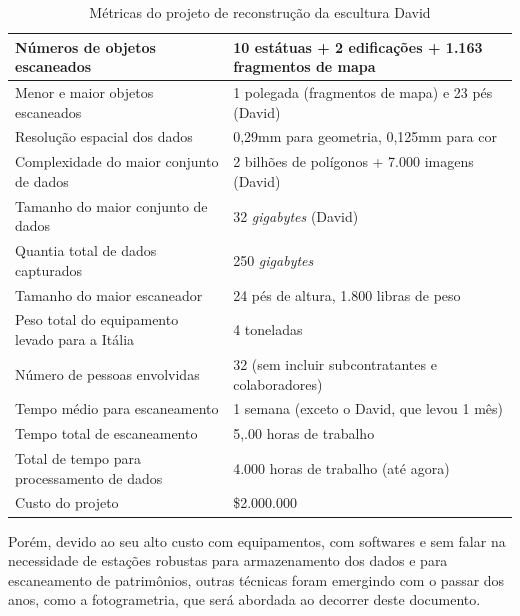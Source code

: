 \begin{table}
\caption{Métricas do projeto de reconstrução da escultura David}
\label{tab:metricasDavid}
\begin{tabular}{|l|p{4.7cm}|}
\hline
Números de objetos escaneados          & 10 estátuas + 2 edificações + 1.163 fragmentos de mapa  \\ \hline
Menor e maior objetos escaneados       & 1 polegada (fragmentos de mapa) e 23 pés (David)         \\ \hline
Resolução espacial dos dados                & 0,29mm para geometria, 0,125mm para cor              \\ \hline
Complexidade do maior conjunto de dados             & 2 bilhões de polígonos + 7.000 imagens (David)\\ \hline
Tamanho do maior conjunto de dados                    & 32 \emph{gigabytes} (David)                  \\ \hline
Quantia total de dados capturados              & 250 \emph{gigabytes}                                 \\ \hline
Tamanho do maior escaneador                    & 24 pés de altura, 1.800 libras de peso                  \\ \hline
Peso total do equipamento levado para a Itália & 4 toneladas                                              \\ \hline
Número de pessoas envolvidas                  & 32 (sem incluir subcontratantes e colaboradores) \\ \hline
Tempo médio para escaneamento              & 1 semana (exceto o David, que levou 1 mês)       \\ \hline
Tempo total de escaneamento                 & 5,.00 horas de trabalho                                   \\ \hline
Total de tempo para processamento de dados          & 4.000 horas de trabalho (até agora)                            \\ \hline
Custo do projeto                          & \$2.000.000                                         \\ \hline
\end{tabular}
\end{table}


Porém, devido ao seu alto custo com equipamentos, com softwares e sem falar na necessidade de estações robustas para armazenamento dos dados e para escaneamento de patrimônios, outras técnicas foram emergindo com o passar dos anos, como a fotogrametria, que será abordada ao decorrer deste documento.

% 